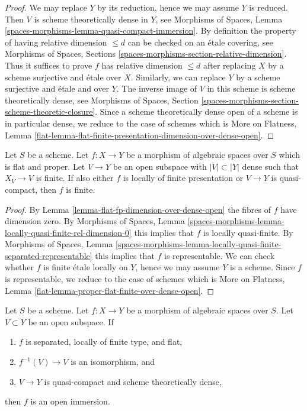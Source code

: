 \begin{proof}
We may replace $Y$ by its reduction, hence we may assume $Y$ is reduced.
Then $V$ is scheme theoretically dense in $Y$, see
Morphisms of Spaces, Lemma
\ref{spaces-morphisms-lemma-quasi-compact-immersion}.
By definition the property of having relative dimension $\leq d$ can
be checked on an \'etale covering, see
Morphisms of Spaces, Sections \ref{spaces-morphisms-section-relative-dimension}.
Thus it suffices to prove $f$ has relative dimension $\leq d$
after replacing $X$ by a scheme surjective and \'etale over $X$.
Similarly, we can replace $Y$ by a scheme surjective and
\'etale and over $Y$. The inverse image of $V$ in this scheme is scheme
theoretically dense, see
Morphisms of Spaces, Section
\ref{spaces-morphisms-section-scheme-theoretic-closure}.
Since a scheme theoretically dense open of a scheme is in particular
dense, we reduce to the case of schemes which is
More on Flatness, Lemma
\ref{flat-lemma-flat-finite-presentation-dimension-over-dense-open}.
\end{proof}

\begin{lemma}
\label{lemma-proper-flat-finite-over-dense-open}
Let $S$ be a scheme. Let $f : X \to Y$ be a morphism of algebraic spaces
over $S$ which is flat and proper. Let $V \to Y$ be an open subspace
with $|V| \subset |Y|$ dense such that $X_V \to V$ is finite. If also
either $f$ is locally of finite presentation or $V \to Y$ is quasi-compact,
then $f$ is finite.
\end{lemma}

\begin{proof}
By Lemma \ref{lemma-flat-fp-dimension-over-dense-open}
the fibres of $f$ have dimension zero.
By Morphisms of Spaces, Lemma
\ref{spaces-morphisms-lemma-locally-quasi-finite-rel-dimension-0}
this implies that $f$ is locally quasi-finite.
By Morphisms of Spaces, Lemma
\ref{spaces-morphisms-lemma-locally-quasi-finite-separated-representable}
this implies that $f$ is representable.
We can check whether $f$ is finite \'etale locally on $Y$,
hence we may assume $Y$ is a scheme. Since  $f$ is representable,
we reduce to the case of schemes which is
More on Flatness, Lemma \ref{flat-lemma-proper-flat-finite-over-dense-open}.
\end{proof}

\begin{lemma}
\label{lemma-zariski}
Let $S$ be a scheme.
Let $f : X \to Y$ be a morphism of algebraic spaces over $S$.
Let $V \subset Y$ be an open subspace. If
\begin{enumerate}
\item $f$ is separated, locally of finite type, and flat,
\item $f^{-1}(V) \to V$ is an isomorphism, and
\item $V \to Y$ is quasi-compact and scheme theoretically dense,
\end{enumerate}
then $f$ is an open immersion.
\end{lemma}

